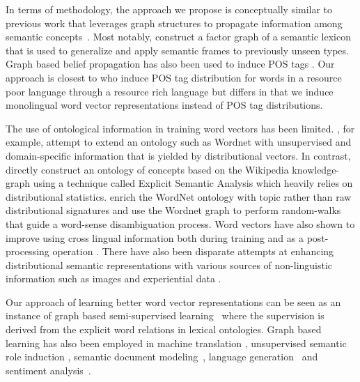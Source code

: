 \documentclass[11pt]{article}
\begin{document}
In terms of methodology, the approach we propose is conceptually similar to previous work that leverages graph 
structures to propagate information among semantic concepts~\cite{Zhu:2005:SLG:1104523,10.1109/TPAMI.2007.70765}. Most notably,  
construct a factor graph of a semantic lexicon that is used to generalize and apply semantic frames to previously 
unseen types. Graph based belief propagation has also been used to induce POS tags
\cite{Subramanya:2010:EGS:1870658.1870675}.
Our approach is closest to  who induce POS tag distribution
for words in a resource poor language through a resource rich language but differs in that we induce
monolingual word vector representations instead of POS tag distributions.

The use of ontological information in training word vectors has been limited. , for example, attempt to extend an ontology such as Wordnet with unsupervised and domain-specific information that is yielded by distributional vectors. In contrast,  directly construct an ontology of concepts based on the Wikipedia knowledge-graph using a technique called Explicit Semantic Analysis which heavily relies on distributional statistics.  enrich the WordNet ontology with topic rather than raw distributional signatures and  use the Wordnet graph to perform random-walks that guide a word-sense disambiguation process.
Word vectors have also shown to improve using cross lingual information both during
training \cite{zou-EtAl:2013:EMNLP,hermann2014multilingual} and as a post-processing operation \cite{faruqui-dyer:2014:EACL2014}.  
There have also been disparate attempts at enhancing distributional semantic representations with various sources of non-linguistic information such as images \cite{bruni:2011} and experiential data \cite{andrews:2009}.

Our approach of learning better word vector representations can be seen as an instance of graph based
semi-supervised learning~\cite{Zhu:2005:SLG:1104523,Talukdar:2010:EGS:1858681.1858830} 
where the supervision is derived from the explicit word relations in lexical ontologies. Graph based
learning has also been employed in machine translation \cite{Alexandrescu:2009:GLS:1620754.1620772},
unsupervised semantic role induction \cite{Lang:2011:USR:2145432.2145571}, 
semantic document modeling~\cite{schuhmacher:2014}, 
language generation~\cite{Krahmer:2003:GGR:778822.778825} and
sentiment analysis~\cite{Goldberg:2006:SSA:1654758.1654769}.
\end{document}
